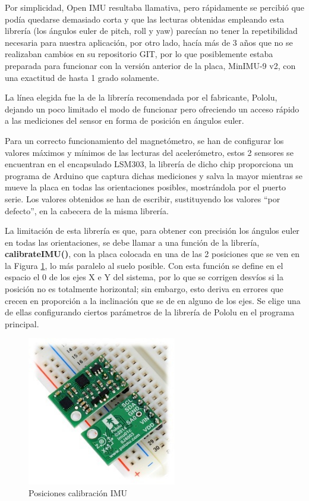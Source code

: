 Por simplicidad, Open IMU resultaba llamativa, pero rápidamente se percibió que podía quedarse demasiado corta y que las lecturas obtenidas empleando esta librería (los ángulos euler de pitch, roll y yaw) parecían no tener la repetibilidad necesaria para nuestra aplicación, por otro lado, hacía más de 3 años que no se realizaban cambios en su repositorio GIT, por lo que posiblemente estaba preparada para funcionar con la versión anterior de la placa, MinIMU-9 v2, con una exactitud de hasta 1 grado solamente.

La línea elegida fue la de la librería recomendada por el fabricante, Pololu, dejando un poco limitado el modo de funcionar pero ofreciendo un acceso rápido a las mediciones del sensor en forma de posición en ángulos euler.

Para un correcto funcionamiento del magnetómetro, se han de configurar los valores máximos y mínimos de las lecturas del acelerómetro, estos 2 sensores se encuentran en el encapsulado LSM303, la librería de dicho chip proporciona un programa de Arduino que captura dichas mediciones y salva la mayor mientras se mueve la placa en todas las orientaciones posibles, mostrándola por el puerto serie. Los valores obtenidos se han de escribir, sustituyendo los valores ``por defecto'', en la cabecera de la misma librería.

La limitación de esta librería es que, para obtener con precisión los ángulos euler en todas las orientaciones, se debe llamar a una función de la librería, \textbf{calibrateIMU()}, con la placa colocada en una de las 2 posiciones que se ven en la Figura \ref{fig:IMU_positions}, lo más paralelo al suelo posible. Con esta función se define en el espacio el 0 de los ejes X e Y del sistema, por lo que se corrigen desvíos si la posición no es totalmente horizontal; sin embargo, esto deriva en errores que crecen en proporción a la inclinación que se de en alguno de los ejes. Se elige una de ellas configurando ciertos parámetros de la librería de Pololu en el programa principal.

\begin{figure}
\centering
\includegraphics[width=65mm]{Figures/IMU_positions}
\caption[Posiciones calibración IMU]{Posiciones calibración IMU}
\label{fig:IMU_positions}
\end{figure}

